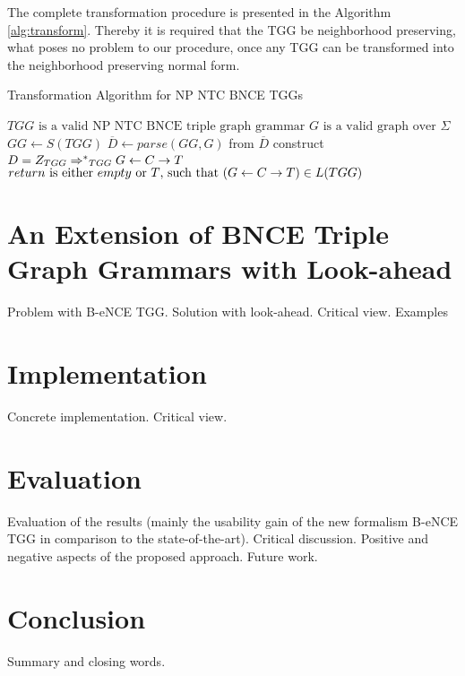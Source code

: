 \documentclass[]{report}
\begin{document}
The complete transformation procedure is presented in the Algorithm \ref{alg:transform}. Thereby it is required that the TGG be neighborhood preserving, what poses no problem to our procedure, once any TGG can be transformed into the neighborhood preserving normal form. 


\begin{algorithm}[!h]
	\caption{Transformation Algorithm for NP NTC BNCE TGGs}
	\begin{algorithmic}[!ht]
		\Require $TGG \text{ is a valid NP NTC BNCE triple graph grammar}$
		\Require $G \text{ is a valid graph over } \Sigma$
		\State $GG \gets S(TGG)$ 
		\State $\overline{D} \gets parse(GG,G)$ 
		 
		\State from $\overline{D}$ construct $D = \startTG{TGG} \derivtr{}{}{TGG} G \ms{} C \mt{} T$
		\State {}
		\Else
		\State {} 
		\EndIf
		\EndFunction 
		\Ensure $return \text{ is either } empty \text{ or } T \text{, such that } (G \overset{}{\leftarrow} C \overset{}{\rightarrow} T) \in L(TGG)$
	\end{algorithmic}
	\label{alg:transform}
\end{algorithm}


\section{An Extension of BNCE Triple Graph Grammars with Look-ahead}
Problem with B-eNCE TGG. Solution with look-ahead. Critical view. Examples

\section{Implementation}
Concrete implementation. Critical view.

\section{Evaluation}
Evaluation of the results (mainly the usability gain of the new formalism B-eNCE TGG in comparison to the state-of-the-art). Critical discussion. Positive and negative aspects of the proposed approach. Future work.

\section{Conclusion}
Summary and closing words.
\end{document}
